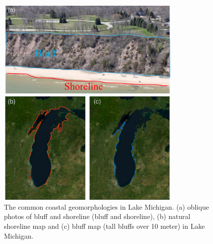 \begin{figure}[htbp]
  \centering
  \includegraphics[width=0.8\textwidth]{chapter1/resources/figure1-1.jpg}
  \caption{The common coastal geomorphologies in Lake Michigan. (a) oblique photos of bluff and shoreline (bluff and shoreline), (b) natural shoreline map and (c) bluff map (tall bluffs over 10 meter) in Lake Michigan.}
  \label{fig:fig1.1}
\end{figure}


